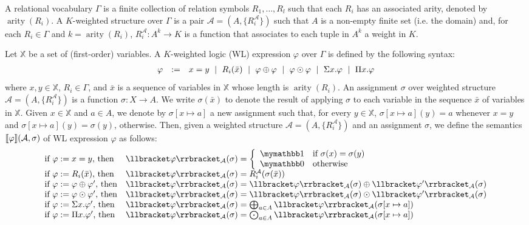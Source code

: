 \newcommand{\cA}{\mathcal{A}}
\newcommand{\bbX}{\mathbb{X}}
\newcommand{\arity}{\operatorname{arity}}

A relational vocabulary $\Gamma$ is a finite collection of relation symbols $R_1, \ldots, R_l$ such that each $R_i$ has an associated arity, denoted by $\arity(R_i)$.
A $K$-weighted structure over $\Gamma$ is a pair $\cA = (A, \{R_i^\cA\})$ such that $A$ is a non-empty finite set (i.e. the domain) and, for each $R_i \in \Gamma$ and $k = \arity(R_i)$, $R_i^\cA: A^k \rightarrow K$ is a function that associates to each tuple in $A^k$ a weight in $K$. 

Let $\bbX$ be a set of (first-order) variables. A $K$-weighted logic (WL) expression $\varphi$ over $\Gamma$ is defined by the following syntax:
$$
\begin{array}{rcl}
\varphi & := & x = y \ \mid \ R_i(\bar{x}) \ \mid \ \varphi \oplus \varphi \ \mid \ \varphi \odot \varphi \ \mid \ \Sigma x. \varphi \ \mid \ \Pi x. \varphi
\end{array}
$$ 
where $x, y \in \bbX$, $R_i \in \Gamma$, and $\bar{x}$ is a sequence of variables in $\bbX$ whose length is $\arity(R_i)$. An assignment $\sigma$ over weighted structure $\cA = (A, \{R_i^\cA\})$ is a function $\sigma: X \rightarrow A$. We write $\sigma(\bar{x})$ to denote the result of applying $\sigma$ to each variable in the sequence $\bar{x}$ of variables in $\bbX$. Given $x \in \bbX$ and $a \in A$, we denote by $\sigma[x \mapsto a]$ a new assignment such that, for every $y \in \bbX$, $\sigma[x \mapsto a](y) = a$ whenever $x = y$ and $\sigma[x \mapsto a](y) = \sigma(y)$, otherwise. Then, given a weighted structure $\cA = (A, \{R_i^\cA\})$ and an assignment $\sigma$, we define the semantics $\sem{\varphi}{\cA, \sigma}$ of WL expression $\varphi$ as follows:
$$
\begin{array}{ll}
\text{if $\varphi := x = y$, then} & \ssem{\varphi}{\cA}(\sigma) = 
\left\{
\begin{array}{ll}
\kone & \text{if $\sigma(x) = \sigma(y)$} \\
\kzero & \text{otherwise}
\end{array}
\right. \\
\text{if $\varphi := R_i(\bar{x})$, then} & \ssem{\varphi}{\cA}(\sigma) = R_i^\cA(\sigma(\bar{x})) \\
\text{if $\varphi := \varphi \ksum \varphi'$, then} & \ssem{\varphi}{\cA}(\sigma) = \ssem{\varphi}{\cA}(\sigma) \ksum \ssem{\varphi'}{\cA}(\sigma)  \\
\text{if $\varphi := \varphi \kprod \varphi'$, then} & \ssem{\varphi}{\cA}(\sigma) = \ssem{\varphi}{\cA}(\sigma) \kprod \ssem{\varphi'}{\cA}(\sigma)  \\
\text{if $\varphi := \Sigma x. \varphi'$, then} & \ssem{\varphi}{\cA}(\sigma) =  \bigksum_{a \in A} \ssem{\varphi}{\cA}(\sigma[x \mapsto a]) \\
\text{if $\varphi := \Pi x. \varphi'$, then} & \ssem{\varphi}{\cA}(\sigma) =  \bigkprod_{a \in A} \ssem{\varphi}{\cA}(\sigma[x \mapsto a])
\end{array}
$$

